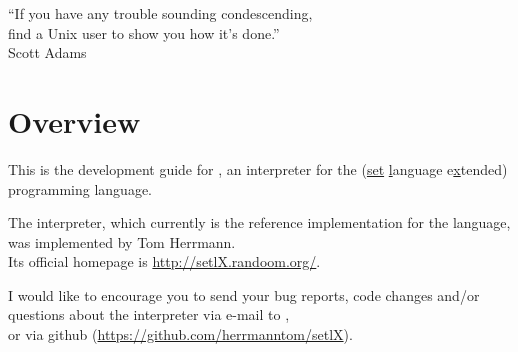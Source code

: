 


\globalDate{\today}
\globalKeywords{}







\begin{titlepage}
\maketitle

\vfill

\begin{center}
\Large
``If you have any trouble sounding condescending,\\
find a Unix user to show you how it's done.''\\
Scott Adams
\end{center}

\vfill
\end{titlepage}

\tableofcontents

\newpage

\section{Overview}

This is the development guide for \setlX, an interpreter for the \SetlX{} (\underline{set} \underline{l}anguage e\underline{x}tended) programming language.

The \setlX{} interpreter, which currently is the reference implementation for the \SetlX{} language, was implemented by Tom Herrmann.\\
Its official homepage is \url{http://setlX.randoom.org/}.

I would like to encourage you to send your bug reports, code changes and\slash{}or questions about the \setlX{} interpreter via e-mail to ,\\
or via github (\url{https://github.com/herrmanntom/setlX}).

